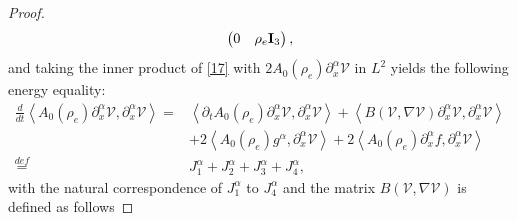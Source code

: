 \documentclass[10pt,a4paper]{amsart}
\newcommand{\al}{\alpha}
\newcommand{\pa}{\partial}
\newcommand{\pt}{\partial_t}
\begin{document}
\begin{proof}
\begin{equation*}
\begin{pmatrix}
    0 & \rho_e {\bf{I}}_3
    \end{pmatrix},
\end{equation*}
and taking the inner product of \eqref{17} with $2A_0(\rho_e)\pa_x^\al \mathcal{V}$ in $L^2$ yields the following energy equality:
\begin{equation}\label{18}
\begin{aligned}
    \frac{d}{dt} \left< A_0(\rho_e)\pa_x^\al \mathcal{V}, \pa_x^\al \mathcal{V} \right> = & \left< \pt A_0(\rho_e)\pa_x^\al \mathcal{V}, \pa_x^\al \mathcal{V} \right>+\left<  B(\mathcal{V},\nabla\mathcal{V})\pa_x^\al \mathcal{V}, \pa_x^\al \mathcal{V} \right>\\
    & +2\left<  A_0(\rho_e)g^\alpha, \pa_x^\al \mathcal{V} \right>+2\left<  A_0(\rho_e)\pa_x^\al f, \pa_x^\al \mathcal{V} \right>\\
    \overset{def}{=}& J_1^\alpha+J_2^\alpha+J_3^\alpha+J_4^\alpha,
\end{aligned}
\end{equation}
with the natural correspondence of $J_1^\alpha$ to $J_4^\alpha$ and the matrix $B(\mathcal{V},\nabla\mathcal{V})$ is defined as follows


\end{proof}
\end{document}
